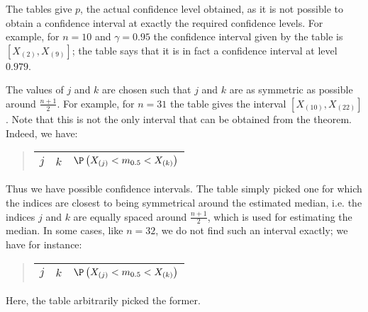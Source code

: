 \begin{petiteNote} The tables give $p$, the actual confidence
level obtained, as it is not possible to obtain a
confidence interval at exactly the required
confidence levels. For example, for $n=10$ and
$\gamma=0.95$ the confidence interval given by
the table is $ \left[X_{(2)},X_{(9)}\right]$; the
table says that it is in fact a confidence
interval at level $0.979$.

The values of $j$ and $k$ are chosen such that
$j$ and $k$ are as symmetric as possible around
$\frac{n+1}{2}$. For example, for $n=31$ the
table gives the interval
$\left[X_{(10)},X_{(22)}\right]$. Note that this
is not the only interval that can be obtained
from the theorem. Indeed, we have:\begin{quote}
\begin{tabular}{c c c}
  $j$ & $k$ &  $\P\left(X_{(j)}< m_{0.5} < X_{(k)}\right)$\\
  \hline
\end{tabular}%
\end{quote}
Thus we have  possible confidence
intervals. The table simply picked one for which
the indices are closest to
 being symmetrical around the estimated median, i.e. the indices $j$ and $k$ are equally
 spaced around $\frac{n+1}{2}$, which is used for estimating the median. In some cases,
  like $n=32$, we do not find such an interval exactly; we have for instance:
  \begin{quote}
\begin{tabular}{c c c}
  $j$ & $k$ &  $\P\left(X_{(j)}< m_{0.5} < X_{(k)}\right)$\\
  \hline
  
\end{tabular}%
\end{quote}
Here, the table arbitrarily picked the former.
\end{petiteNote}


